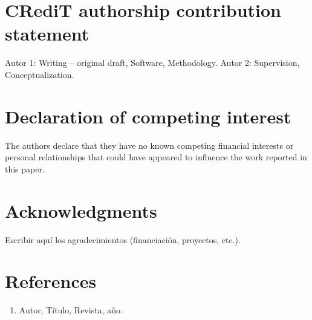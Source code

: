 
\section*{CRediT authorship contribution statement}
Autor 1: Writing -- original draft, Software, Methodology. Autor 2: Supervision, Conceptualization.

\section*{Declaration of competing interest}
The authors declare that they have no known competing financial interests or personal relationships that could have appeared to influence the work reported in this paper.

\section*{Acknowledgments}
Escribir aquí los agradecimientos (financiación, proyectos, etc.).

\section*{References}
\begin{enumerate}
  \item Autor, Título, Revista, año.
\end{enumerate}

